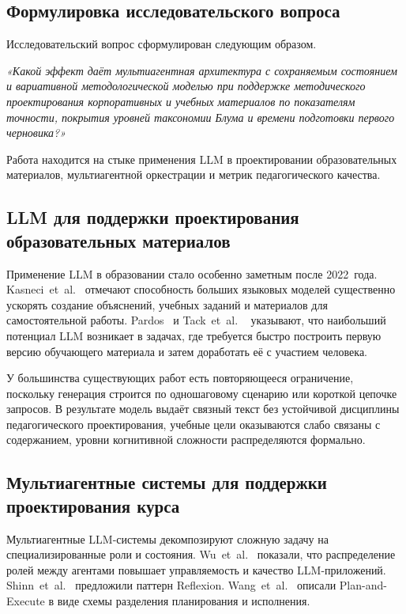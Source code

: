 \subsection{Формулировка исследовательского вопроса}

Исследовательский вопрос сформулирован следующим образом.

\textit{«Какой эффект даёт мультиагентная архитектура с сохраняемым состоянием
и вариативной методологической моделью при
поддержке методического проектирования корпоративных и учебных материалов
по показателям точности, покрытия уровней таксономии Блума
и времени подготовки первого черновика?»}

Работа находится на стыке применения LLM в проектировании образовательных
материалов, мультиагентной оркестрации и метрик педагогического качества.

\subsection{LLM для поддержки проектирования образовательных материалов}

Применение LLM в образовании стало особенно заметным после 2022~года.
Kasneci~et~al.~\cite{kasneci_llm_education_2023} отмечают способность
больших языковых моделей существенно ускорять создание
объяснений, учебных заданий и материалов для самостоятельной работы.
Pardos~\cite{pardos_llm_instructional_2023} и Tack~et~al.
~\cite{tack_aied_2022} указывают, что наибольший потенциал LLM
возникает в задачах, где требуется быстро построить первую версию
обучающего материала и затем доработать её с участием человека.

У большинства существующих работ есть повторяющееся ограничение, поскольку
генерация строится по одношаговому сценарию или короткой цепочке запросов.
В результате модель выдаёт связный текст без устойчивой дисциплины
педагогического проектирования, учебные цели оказываются
слабо связаны с содержанием, уровни когнитивной сложности
распределяются формально.

\subsection{Мультиагентные системы для поддержки проектирования курса}

Мультиагентные LLM-системы декомпозируют сложную задачу
на специализированные роли и состояния.
Wu~et~al.~\cite{wu_autogen_2023} показали, что распределение
ролей между агентами повышает управляемость и качество
LLM-приложений. Shinn~et~al.~\cite{shinn_reflexion_2023} предложили
паттерн Reflexion. Wang~et~al.~\cite{wang_plan_and_execute_2023}
описали Plan-and-Execute в виде схемы разделения планирования и исполнения.

